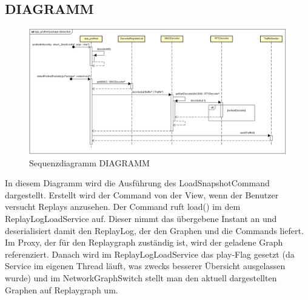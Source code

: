 \subsection{DIAGRAMM}
\begin{figure}[H]
  \centering
  \includegraphics[width=\textwidth]{../diagramimages/spp-profinet-package-dissection.png}
  \caption[Sequenzdiagramm DIAGRAMM]{Sequenzdiagramm DIAGRAMM}
\end{figure}

In diesem Diagramm wird die Ausführung des LoadSnapshotCommand dargestellt. Erstellt wird der Command von der View, wenn der Benutzer versucht Replays anzusehen. Der Command ruft load() im dem ReplayLogLoadService auf. Dieser nimmt das übergebene Instant an und deserialisiert damit den ReplayLog, der den Graphen und die Commands liefert. Im Proxy, der für den Replaygraph zuständig ist, wird der geladene Graph referenziert. Danach wird im ReplayLogLoadService das play-Flag gesetzt (da Service im eigenen Thread läuft, was zwecks besserer Übersicht ausgelassen wurde) und im NetworkGraphSwitch stellt man den
aktuell dargestellten Graphen auf Replaygraph um.